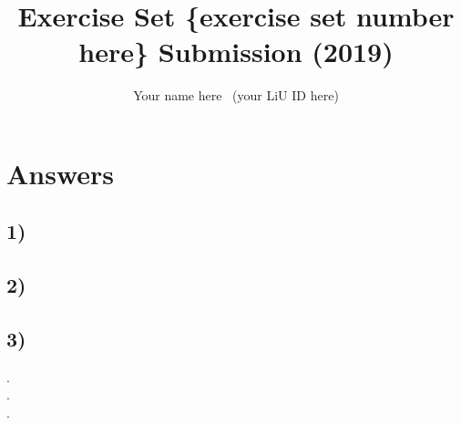 \documentclass[10pt]{article}
\title {Exercise Set \{exercise set number here\} Submission (2019)}
\author{Your name here \, (your LiU ID here)}
\begin{document}
\maketitle

\section*{Answers}

\subsection*{1)}
\subsection*{2)}
\subsection*{3)}
.\\ %
.\\ %
.\\ %
\end{document}
